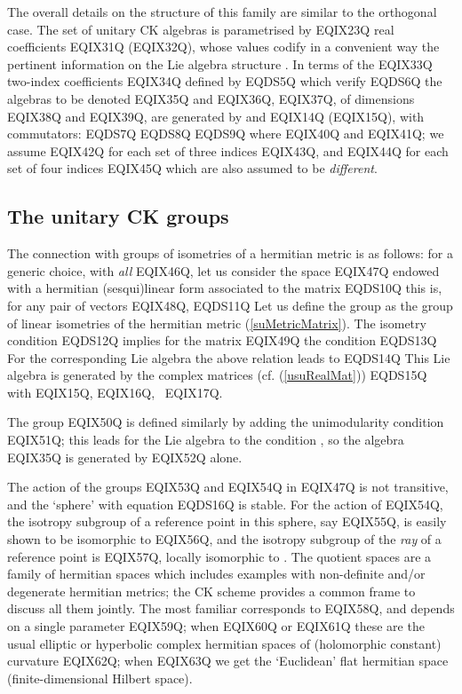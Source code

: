 The overall details on the structure of this family are similar
to the orthogonal case. The set of unitary CK algebras is parametrised by
EQIX23Q real coefficients EQIX31Q (EQIX32Q), whose values codify in a
convenient way the pertinent information on the Lie algebra structure
\cite{Her:95,Her.San:96}. In terms of the EQIX33Q
two-index coefficients
EQIX34Q defined by
EQDS5Q
which verify
EQDS6Q
the algebras to be denoted EQIX35Q and EQIX36Q,
EQIX37Q, of
dimensions EQIX38Q and EQIX39Q, are generated by  and EQIX14Q (EQIX15Q), with commutators:
EQDS7Q
EQDS8Q
EQDS9Q
where EQIX40Q and EQIX41Q; we assume
EQIX42Q for each set of three  indices  EQIX43Q, and EQIX44Q
for each set of four indices EQIX45Q which are also assumed to
be \emph{different}.

\subsection{The unitary CK groups}

The connection with groups of isometries of a hermitian metric is as
follows: for a generic choice, with \emph{all} EQIX46Q, let us
consider the space EQIX47Q endowed with a hermitian
(sesqui)linear form  associated to the matrix
EQDS10Q
this is, for any pair of vectors EQIX48Q,
EQDS11Q
Let us define the group  as the group of linear isometries of
the hermitian metric (\ref{suMetricMatrix}). The isometry
condition
EQDS12Q
implies for the matrix
EQIX49Q the condition
EQDS13Q
For the corresponding Lie algebra the above relation leads to
EQDS14Q
This Lie algebra is generated by
the complex matrices (cf. (\ref{usuRealMat}))
EQDS15Q
with EQIX15Q, EQIX16Q, \ EQIX17Q.

The group EQIX50Q is
defined similarly by adding the unimodularity condition EQIX51Q;
this leads for the Lie algebra to the condition , so the algebra EQIX35Q is generated by
EQIX52Q alone.

The action of the groups EQIX53Q and EQIX54Q in
EQIX47Q is not transitive, and the `sphere' with equation
EQDS16Q
is stable. For the action of
EQIX54Q, the isotropy subgroup of a reference point in this
sphere, say EQIX55Q, is easily shown to be isomorphic to
EQIX56Q, and the isotropy subgroup of the
\emph{ray} of a reference point is
EQIX57Q, locally isomorphic to . The quotient spaces
 are a family of  hermitian spaces which
includes examples with non-definite and/or
degenerate hermitian metrics; the CK scheme provides a common frame to discuss
all them jointly. The most familiar corresponds to EQIX58Q,
and depends on a single parameter EQIX59Q; when EQIX60Q or EQIX61Q these
are the usual elliptic or hyperbolic complex hermitian spaces of (holomorphic
constant) curvature EQIX62Q; when EQIX63Q we get
the `Euclidean' flat hermitian space (finite-dimensional Hilbert space).

